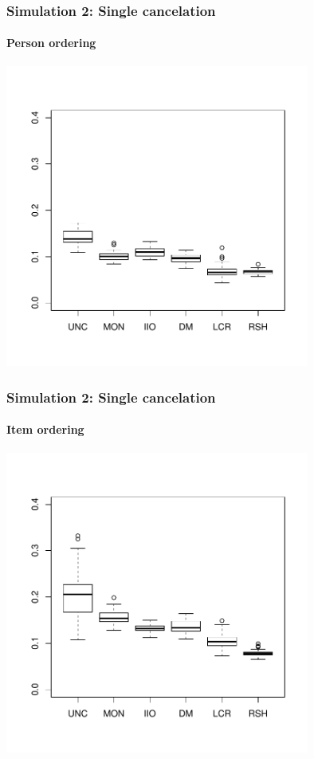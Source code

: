 \documentclass[10pt,serif,professionalfont]{beamer}
\begin{document}
\begin{frame}
    \frametitle{Simulation 2: Single cancelation}
        \framesubtitle{Person ordering}

    \centering \includegraphics[width=0.75\textwidth]{./figs/violations_columns_weighted.pdf}

\end{frame}

\begin{frame}
    \frametitle{Simulation 2: Single cancelation}
        \framesubtitle{Item ordering}

    \centering \includegraphics[width=0.75\textwidth]{./figs/violations_rows_weighted.pdf}

\end{frame}
\end{document}
